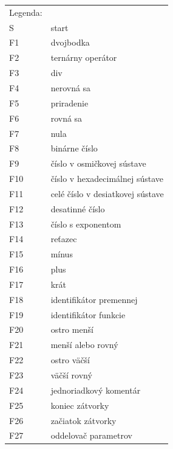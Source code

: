 \documentclass [11pt, a4paper]{article}
\begin{document}
\begin{table}[h]
\begin{tabular}{l l}
Legenda:& \\
S &\qquad start\\
F1 &\qquad dvojbodka\\
F2 &\qquad ternárny operátor\\
F3 &\qquad div\\
F4 &\qquad nerovná sa \\
F5 &\qquad priradenie\\
F6 &\qquad rovná sa\\
F7 &\qquad nula\\
F8 &\qquad binárne číslo\\
F9 & \qquad číslo v osmičkovej sústave\\
F10&\qquad číslo v hexadecimálnej sústave\\
F11&\qquad celé číslo v desiatkovej sústave\\
F12&\qquad desatinné číslo\\
F13&\qquad číslo s exponentom\\
F14&\qquad reťazec\\
F15& \qquad mínus\\
F16&\qquad plus\\
F17&\qquad krát\\
F18&\qquad identifikátor premennej\\
F19&\qquad identifikátor funkcie\\
F20&\qquad ostro menší\\
F21&\qquad menší alebo rovný\\
F22&\qquad ostro väčší\\
F23&\qquad väčší rovný\\
F24&\qquad jednoriadkový komentár\\
F25&\qquad koniec zátvorky\\
F26&\qquad začiatok zátvorky\\
F27&\qquad oddelovač parametrov\\
\end{tabular}
\end{table}
\end{document}
